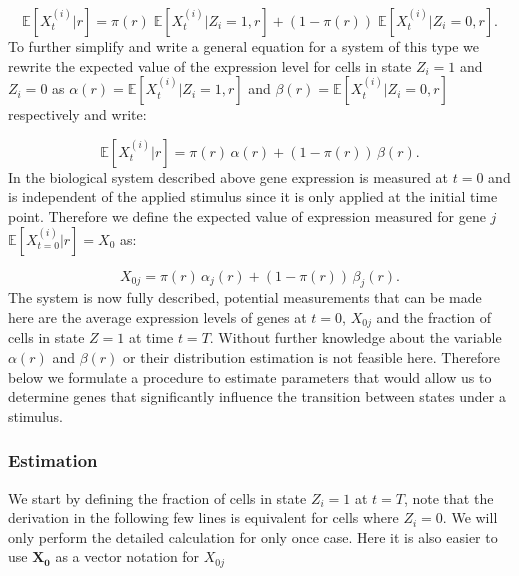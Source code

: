 \begin{equation}
  \mathbb{E} [X_t^{(i)} | r] = \pi(r)\; \mathbb{E} [X_t^{(i)} | Z_i =1, r] + \left( 1 - \pi(r) \right)\; \mathbb{E} [X_t^{(i)} | Z_i =0, r].
\end{equation}
To further simplify and write a general equation for a system of this type we rewrite the expected value of the expression level for cells in state $Z_i = 1$ and $Z_i = 0$ as $\alpha(r) = \mathbb{E} [X_t^{(i)} | Z_i =1, r]$ and  $\beta(r) =  \mathbb{E} [X_t^{(i)} | Z_i = 0, r]$ respectively and write:

\begin{equation}
  \label{eq:general-cc}
  \mathbb{E} [X_t^{(i)} | r] = \pi(r) \, \alpha(r) + \left( 1 - \pi(r) \right) \, \beta(r). 
\end{equation}
In the biological system described above gene expression is measured at $t=0$ and is independent of the applied stimulus since it is only applied at the initial time point. Therefore we define the expected value of expression measured for gene $j$  $\mathbb{E}[X_{t=0}^{(i)} | r] = X_0 $ as:

\begin{equation}
  \label{eq:init-cc}
  X_{0j} = \pi(r) \, \alpha_j(r) + \left( 1 - \pi(r) \right) \, \beta_j(r). 
\end{equation}
The system is now fully described, potential measurements that can be made here are the average expression levels of genes at $t=0$, $X_{0j}$ and the fraction of cells in state $Z = 1$ at time $t=T$. Without further knowledge about the variable $\alpha(r)$ and $\beta(r)$ or their distribution estimation is not feasible here. Therefore below we formulate a procedure to estimate parameters that would allow us to determine genes that significantly influence the transition between states under a stimulus.

\subsubsection{Estimation}
\label{sec:estimation-cc}

We start by defining the fraction of cells in state $Z_i = 1$ at $t = T$, note that the derivation in the following few lines is equivalent for cells where $Z_i =0 $. We will only perform the detailed calculation for only once case. Here it is also easier to use $\mathbf{X_0}$ as a vector notation for $X_{0j}$


